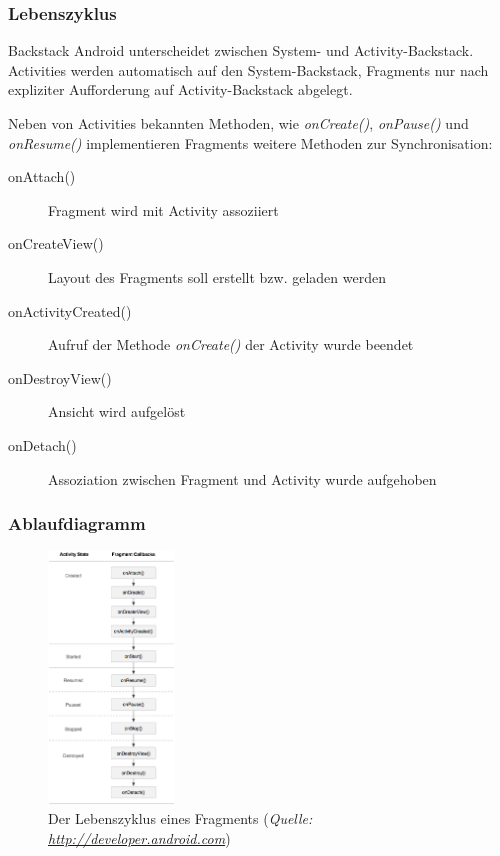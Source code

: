 \begin{frame}[label=fragments]
   \frametitle{Lebenszyklus}
   
   \begin{alertblock}{Backstack}
		Android unterscheidet zwischen System- und Activity-Backstack. Activities 
		werden automatisch auf den System-Backstack, Fragments nur nach expliziter 
		Aufforderung auf Activity-Backstack abgelegt. 
   \end{alertblock}
   
   Neben von Activities bekannten Methoden, wie \emph{onCreate()}, \emph{onPause()} 
	und \emph{onResume()} implementieren Fragments weitere Methoden zur Synchronisation:

	\begin{description}
		\item[onAttach()] Fragment wird mit Activity assoziiert
		\item[onCreateView()] Layout des Fragments soll erstellt bzw. geladen werden
		\item[onActivityCreated()] Aufruf der Methode \emph{onCreate()} der Activity wurde beendet
		\item[onDestroyView()] Ansicht wird aufgelöst
		\item[onDetach()] Assoziation zwischen Fragment und Activity wurde aufgehoben
	\end{description}
\end{frame}

\begin{frame}[label=activity_fragment_lifecycle]
   \frametitle{Ablaufdiagramm}
	\begin{figure}[h!]
	  \centering
	  \includegraphics[width=0.3\textwidth]{pictures/activity_fragment_lifecycle.eps}
	  \caption{
		  Der Lebenszyklus eines Fragments
		  (\emph{Quelle: 
		     \href{http://developer.android.com}{http://developer.android.com}})
	  }
	  \label{fig:activity_fragment_lifecycle}
	\end{figure}
\end{frame}

